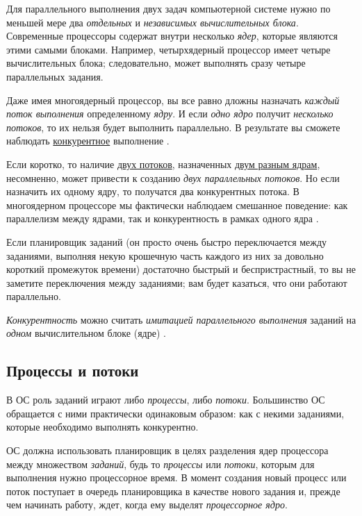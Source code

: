 \documentclass[%
	11pt,
	a4paper,
	utf8,
		]{article}
\begin{document}
Для параллельного выполнения двух задач компьютерной системе нужно по меньшей мере два \emph{отдельных} и \emph{независимых вычислительных блока}. Современные процессоры содержат внутри несколько \emph{ядер}, которые являются этими самыми блоками. Например, четырхядерный процессор имеет четыре вычислительных блока; следовательно, может выполнять сразу четыре параллельных задания.

Даже имея многоядерный процессор, вы все равно дложны назначать \emph{каждый поток выполнения} определенному \emph{ядру}. И если \emph{одно ядро} получит \emph{несколько потоков}, то их {\color{red}нельзя будет выполнить параллельно}. В результате вы сможете наблюдать \underline{конкурентное} выполнение \cite[]{amini-extreme-c:2022}.

Если коротко, то наличие \underline{двух потоков}, назначенных \underline{двум разным ядрам}, несомненно, может привести к созданию \emph{двух параллельных потоков}. Но если назначить их одному ядру, то получатся два конкурентных потока. В многоядерном процессоре мы фактически наблюдаем смешанное поведение: как параллелизм между ядрами, так и конкурентность в рамках одного ядра \cite[]{amini-extreme-c:2022}.

Если планировщик заданий (он просто очень быстро переключается между заданиями, выполняя некую крошечную часть каждого из них за довольно короткий промежуток времени) достаточно быстрый и беспристрастный, то вы не заметите переключения между заданиями; вам будет казаться, что они работают параллельно. 

\emph{Конкурентность} можно считать \emph{имитацией параллельного выполнения} заданий на \emph{одном} вычислительном блоке (ядре) \cite[]{amini-extreme-c:2022}.

\subsection{Процессы и потоки}

В ОС роль заданий играют либо \emph{процессы}, либо \emph{потоки}. Большинство ОС обращается с ними практически одинаковым образом: как с некими заданиями, которые необходимо выполнять конкурентно.

ОС должна использовать планировщик в целях разделения ядер процессора между множеством \emph{заданий}, будь то \emph{процессы} или \emph{потоки}, которым для выполнения нужно процессорное время. В момент создания новый процесс или поток поступает в очередь планировщика в качестве нового задания и, прежде чем начинать работу, ждет, когда ему выделят \emph{процессорное ядро}.
\end{document}
